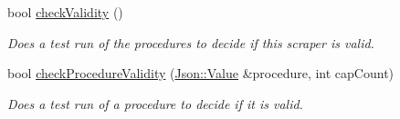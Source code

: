 \begin{DoxyCompactItemize}
bool \hyperlink{class_a_w_e_1_1_j_s_o_n_scraper_ac83bcfb3d69108024c23ff49e8b8c274}{check\-Validity} ()
\begin{DoxyCompactList}\small\item\em Does a test run of the procedures to decide if this scraper is valid. \end{DoxyCompactList}\item 
bool \hyperlink{class_a_w_e_1_1_j_s_o_n_scraper_ac73167b683a6dec42cd84211e337dc46}{check\-Procedure\-Validity} (\hyperlink{class_json_1_1_value}{Json\-::\-Value} \&procedure, int cap\-Count)
\begin{DoxyCompactList}\small\item\em Does a test run of a procedure to decide if it is valid. \end{DoxyCompactList}\end{DoxyCompactItemize}
